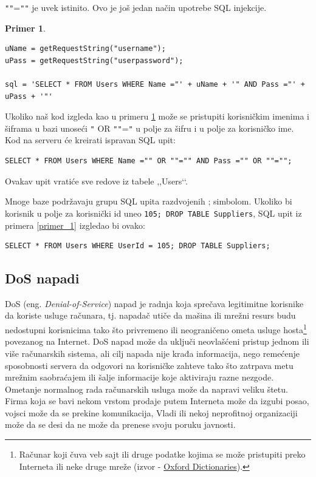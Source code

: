 \documentclass[a4paper]{article}
\theoremstyle{break}
\newtheorem{primer}{Primer}[subsection]
\begin{document}
{\texttt{"}\texttt{"}=\texttt{"}\texttt{"} je uvek istinito. Ovo je još jedan način upotrebe SQL injekcije.
\begin{primer}
\label{primer_2}
\begin{lstlisting}[frame=single]
uName = getRequestString("username");
uPass = getRequestString("userpassword");

sql = 'SELECT * FROM Users WHERE Name ="' + uName + '" AND Pass ="' + uPass + '"'
\end{lstlisting}
\end{primer}

\noindent Ukoliko naš kod izgleda kao u primeru \ref{primer_2} može se pristupiti korisničkim imenima i šiframa u bazi unoseći \texttt{"} OR \texttt{"}\texttt{"}=\texttt{"} u polje za šifru i u polje za korisničko ime. Kod na serveru će kreirati ispravan SQL upit:

\begin{lstlisting}[frame=single]
SELECT * FROM Users WHERE Name ="" OR ""="" AND Pass ="" OR ""="";
\end{lstlisting}
\noindent Ovakav upit vratiće sve redove iz tabele ,,Users‘‘. 

Mnoge baze podržavaju grupu SQL upita razdvojenih ; simbolom. Ukoliko bi korisnik u polje za korisnički id uneo \texttt{105; DROP TABLE Suppliers}, SQL upit iz primera \ref{primer_1} izgledao bi ovako:

\begin{lstlisting}[frame=single]
SELECT * FROM Users WHERE UserId = 105; DROP TABLE Suppliers; 
\end{lstlisting}

\subsection{DoS napadi}
\label{subsec:DoS}

DoS (eng. {\em Denial-of-Service}) napad je radnja koja sprečava legitimitne korisnike da koriste usluge računara, tj. napadač utiče da mašina ili mrežni resurs  budu nedostupni korisnicima tako što privremeno ili neograničeno ometa usluge hosta\footnote{Računar koji čuva veb sajt ili druge podatke kojima se može pristupiti preko Interneta ili neke druge mreže (izvor - \href{https://en.oxforddictionaries.com/definition/host}{Oxford Dictionaries}).} povezanog na Internet. DoS napad može da uključi neovlašćeni pristup jednom ili više računarskih sistema, ali cilj napada nije krađa informacija, nego remećenje sposobnosti servera da odgovori na korisničke zahteve tako što zatrpava metu mrežnim saobraćajem ili šalje informacije koje aktiviraju razne nezgode. Ometanje normalnog rada računarskih usluga može da napravi veliku štetu. Firma koja se bavi nekom vrstom prodaje putem Interneta može da izgubi posao, vojsci može da se prekine komunikacija, Vladi ili nekoj neprofitnoj organizaciji može da se desi da ne može da prenese svoju poruku javnosti.

}
\end{document}
